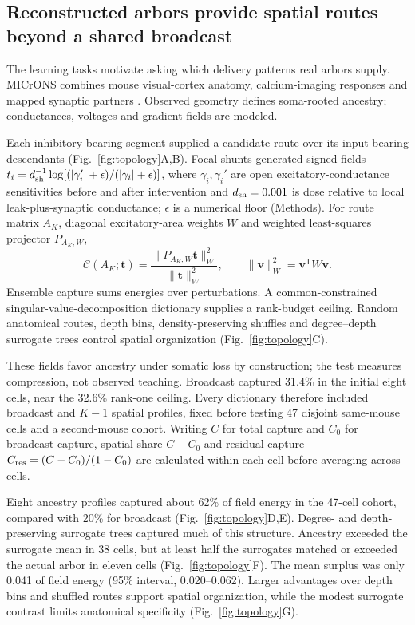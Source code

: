 \documentclass[11pt]{article}
\begin{document}
\subsection*{Reconstructed arbors provide spatial routes beyond a shared broadcast}

The learning tasks motivate asking which delivery patterns real arbors supply. MICrONS combines mouse visual-cortex anatomy, calcium-imaging responses and mapped synaptic partners \citep{microns2025}. Observed geometry defines soma-rooted ancestry; conductances, voltages and gradient fields are modeled.

Each inhibitory-bearing segment supplied a candidate route over its input-bearing descendants (Fig.~\ref{fig:topology}A,B). Focal shunts generated signed fields $t_i=d_{\rm sh}^{-1}\log[(|\gamma_i'|+\epsilon)/(|\gamma_i|+\epsilon)]$, where $\gamma_i,\gamma_i'$ are open excitatory-conductance sensitivities before and after intervention and $d_{\rm sh}=0.001$ is dose relative to local leak-plus-synaptic conductance; $\epsilon$ is a numerical floor (Methods). For route matrix $A_K$, diagonal excitatory-area weights $W$ and weighted least-squares projector $P_{A_K,W}$,
\begin{equation}
\mathcal C(A_K;\bm t)=\frac{\|P_{A_K,W}\bm t\|_W^2}{\|\bm t\|_W^2},\qquad
\|\bm v\|_W^2=\bm v^{\mathsf T}W\bm v.
\label{eq:reconstructioncapture}
\end{equation}
Ensemble capture sums energies over perturbations. A common-constrained singular-value-decomposition dictionary supplies a rank-budget ceiling. Random anatomical routes, depth bins, density-preserving shuffles and degree--depth surrogate trees control spatial organization (Fig.~\ref{fig:topology}C).

These fields favor ancestry under somatic loss by construction; the test measures compression, not observed teaching. Broadcast captured 31.4\% in the initial eight cells, near the 32.6\% rank-one ceiling. Every dictionary therefore included broadcast and $K-1$ spatial profiles, fixed before testing 47 disjoint same-mouse cells and a second-mouse cohort. Writing $C$ for total capture and $C_0$ for broadcast capture, spatial share $C-C_0$ and residual capture $C_{\rm res}=(C-C_0)/(1-C_0)$ are calculated within each cell before averaging across cells.

Eight ancestry profiles captured about 62\% of field energy in the 47-cell cohort, compared with 20\% for broadcast (Fig.~\ref{fig:topology}D,E). Degree- and depth-preserving surrogate trees captured much of this structure. Ancestry exceeded the surrogate mean in 38 cells, but at least half the surrogates matched or exceeded the actual arbor in eleven cells (Fig.~\ref{fig:topology}F). The mean surplus was only 0.041 of field energy (95\% interval, 0.020--0.062). Larger advantages over depth bins and shuffled routes support spatial organization, while the modest surrogate contrast limits anatomical specificity (Fig.~\ref{fig:topology}G).
\end{document}

